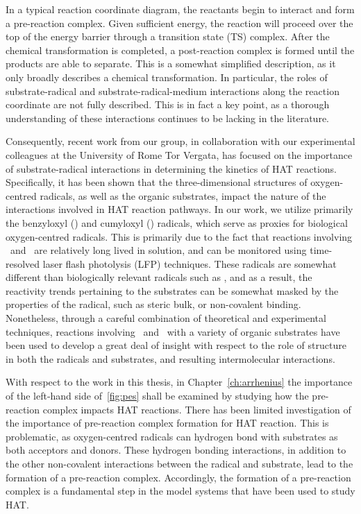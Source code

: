 In a typical reaction coordinate diagram, the reactants begin to interact and
form a pre-reaction complex. Given sufficient energy, the reaction will proceed
over the top of the energy barrier through a transition state (TS) complex.
After the chemical transformation is completed, a post-reaction complex is
formed until the products are able to separate. This is a somewhat simplified
description, as it only broadly describes a chemical transformation. In
particular, the roles of substrate-radical and substrate-radical-medium
interactions along the reaction coordinate are not fully described. This is in
fact a key point, as a thorough understanding of these interactions continues to
be lacking in the literature.

Consequently, recent work from our group, in collaboration with our experimental
colleagues at the University of Rome Tor Vergata, has focused on the importance
of substrate-radical interactions in determining the kinetics of HAT reactions.
Specifically, it has been shown that the three-dimensional structures of
oxygen-centred radicals, as well as the organic substrates, impact the nature of
the interactions involved in HAT reaction pathways.\cite{Salamone2015Rev} In our
work, we utilize primarily the benzyloxyl (\bno) and cumyloxyl (\cumo) radicals,
which serve as proxies for biological oxygen-centred radicals. This is primarily
due to the fact that reactions involving \bno\ and \cumo\ are relatively long
lived in solution, and can be monitored using time-resolved laser flash
photolysis (LFP) techniques. These radicals are somewhat different than
biologically relevant radicals such as , and as a result, the
reactivity trends pertaining to the substrates can be somewhat masked by the
properties of the radical, such as steric bulk,\cite{Finn2004} or non-covalent
binding.\cite{Salamone2011b} Nonetheless, through a careful combination of
theoretical and experimental techniques, reactions involving \bno\ and \cumo\
with a variety of organic substrates have been used to develop a great deal of
insight with respect to the role of structure in both the radicals and
substrates, and resulting intermolecular interactions.

With respect to the work in this thesis, in Chapter~\ref{ch:arrhenius} the
importance of the left-hand side of~\ref{fig:pes} shall be examined by studying
how the pre-reaction complex impacts HAT reactions. There has been limited
investigation of the importance of pre-reaction complex formation for HAT
reaction.\cite{Kreilick1966} This is problematic, as oxygen-centred radicals can
hydrogen bond with substrates as both acceptors and donors.\cite{Johnson2009a}
These hydrogen bonding interactions, in addition to the other non-covalent
interactions between the radical and substrate, lead to the formation of a
pre-reaction complex. Accordingly, the formation of a pre-reaction complex is a
fundamental step in the model systems that have been used to study HAT.

